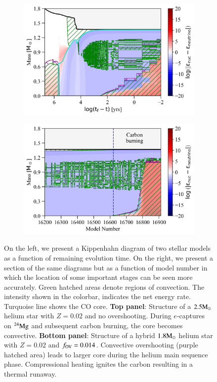 \documentclass[main.tex]{subfiles}
\begin{document}
\begin{figure}[h!]
     \begin{subfigure}{.5\textwidth}
        \centering
        \includegraphics[width=0.95\columnwidth]{figures/chapter2/kipp/series1_rt_1p8M_z0p02_f0p014.png}
    \end{subfigure}\hfill
    \begin{subfigure}{.5\textwidth}
        \centering
        \includegraphics[width=0.95\columnwidth]{figures/chapter2/kipp/vs_model_number/series1_mn_1p8M_z0p02_f0p014.png}
    \end{subfigure}

    \caption{On the left, we present a Kippenhahn diagram of two \seriesone stellar models as a function of remaining evolution time. On the right, we present a section of the same diagrams but as a function of model number in which the location of some important stages can be seen more accurately. Green hatched areas denote regions of convection. The intensity shown in the colorbar, indicates the net energy rate. Turquoise line shows the CO core. \textbf{Top panel}: Structure of a $2.5 \rm M_{\odot}$ helium star with $Z = 0.02$ and no overshooting. During $e$-captures on $\rm ^{24}Mg$ and subsequent carbon burning, the core becomes convective. \textbf{Bottom panel}: Structure of a hybrid $1.8 \rm M_{\odot}$ helium star with $Z = 0.02$ and $f_{\rm OV} = 0.014$. Convective overshooting (purple hatched area) leads to larger core during the helium main sequence phase. Compressional heating ignites the carbon resulting in a thermal runaway.}
    \label{fig:Kipp}
\end{figure}
\end{document}
